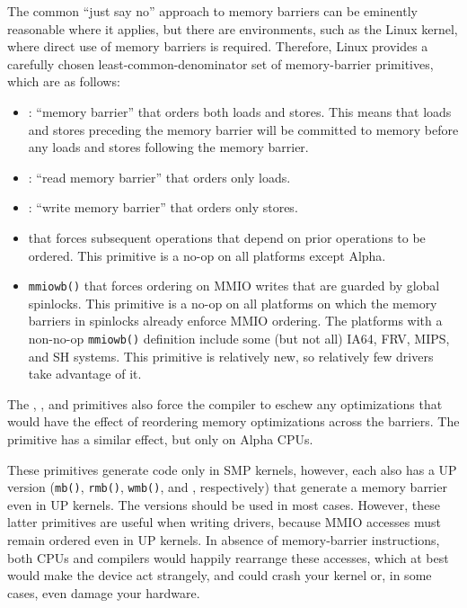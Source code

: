The common ``just say no'' approach to memory barriers
can be eminently reasonable where it applies,
but there are environments, such as the Linux kernel, where direct
use of memory barriers is required.
Therefore,
Linux provides a carefully chosen least-common-denominator
set of memory-barrier primitives, which are as follows:
\begin{itemize}
\item	{}: ``memory barrier'' that orders both loads and
	stores.
	This means that loads and stores preceding the memory barrier
	will be committed to memory before any loads and stores
	following the memory barrier.
\item	{}: ``read memory barrier'' that orders only loads.
\item	{}: ``write memory barrier'' that orders only stores.
\item	{} that forces subsequent operations
	that depend on prior operations to be ordered.
	This primitive is a no-op on all platforms except Alpha.
\item	{\tt mmiowb()} that forces ordering on MMIO writes that are guarded
	by global spinlocks.
	This primitive is a no-op on all platforms on which the memory
	barriers in spinlocks already enforce MMIO ordering.
	The platforms with a non-no-op {\tt mmiowb()} definition include
	some (but not all) IA64, FRV, MIPS, and SH systems.
	This primitive is relatively new, so relatively few drivers take
	advantage of it.
\end{itemize}
The , , and 
primitives also force
the compiler to eschew any optimizations that would have the effect
of reordering memory optimizations across the barriers.
The  primitive has a similar effect, but
only on Alpha CPUs.

These primitives generate code only in SMP kernels, however, each
also has a UP version ({\tt mb()}, {\tt rmb()}, {\tt wmb()},
and ,
respectively) that generate a memory barrier even in UP kernels. The 
versions should be used in most cases. However, these latter primitives
are useful when writing drivers, because MMIO accesses must remain
ordered even in UP kernels. In absence of memory-barrier instructions,
both CPUs and compilers would happily rearrange these accesses, which at
best would make the device act strangely, and could crash your kernel or,
in some cases, even damage your hardware.

